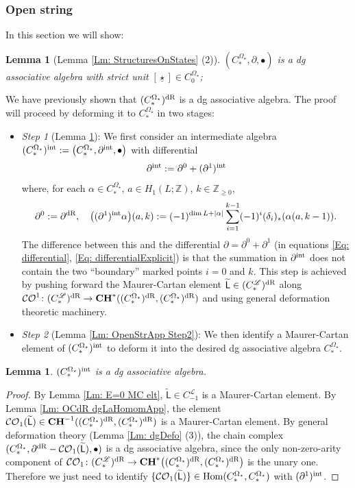 \documentclass[10pt]{amsart}
\numberwithin{equation}{section}
\theoremstyle{plain}
\newtheorem{lemma}[theorem]{Lemma}
\theoremstyle{definition}
\theoremstyle{remark}
\numberwithin{equation}{section}
\newcommand{\Z}{\mathbb{Z}}
\newcommand{\Hom}{\textup{Hom}}
\newcommand{\wt}[1]{\widetilde{#1}}
\newcommand{\dR}{\textup{dR}}
\newcommand{\CO}{\mathcal{CO}}
\newcommand{\CC}{\textbf{\textup{CH}}}
\newcommand{\CFr}{C_*^\mathscr{L}}
\newcommand{\CBa}{C_*^{\Omega_\star}}
\newcommand{\Cfr}[1]{C_{#1}^\mathscr{L}}
\newcommand{\Cba}[1]{C_{#1}^{\Omega_\star}}
\newcommand{\LL}{\textsf{L}}
\begin{document}
{\subsubsection{Open string}
In this section we will show:
\begin{lemma}[Lemma \ref{Lm: StructuresOnStates} (2)]\label{Lm: StructuresOnOpenStatesApp}
	$(\CBa, \partial, \bullet)$ is a dg associative algebra with strict unit $[\underline{\star}] \in \Cba{0}$;
\end{lemma}

We have previously shown that $(\CBa)^\dR$ is a dg associative algebra.
The proof will proceed by deforming it to $\CBa$ in two stages:
\begin{itemize}
	\item \emph{Step 1} (Lemma \ref{Lm: OpenStrApp Step1}): We first consider an intermediate algebra $(\CBa)^\textup{int}:=\big(\CBa, \partial^{\textup{int}}, \bullet\big)$ with differential \begin{align*}
		\partial^{\textup{int}} := \partial^0 + (\partial^1)^{\textup{int}}
	\end{align*}
	where, for each $\alpha \in \CBa$, $a\in H_1(L;\Z)$, $k\in \Z_{\geq 0}$,
	\begin{align}\label{Eq: differentialInt}
			\partial^0:=\partial^\dR,\quad \big((\partial^1)^{\textup{int}} \alpha\big)(a,k):= 
	(-1)^{\dim L+|\alpha|}\sum_{i=1}^{k-1} (-1)^i(\delta_i)_*(\alpha(a,k-1)).
	\end{align}
	The difference between this and the differential $\partial=\partial^0+\partial^1$ (in  equations \eqref{Eq: differential}, \eqref{Eq: differentialExplicit}) is that the summation in $\partial^{\textup{int}}$ does not contain the two ``boundary'' marked points $i=0$ and $k$.
	This step is achieved by pushing forward the Maurer-Cartan element $\wt{\LL} \in (\CFr)^\dR$ along $\CO^1\colon (\CFr)^\dR\to \CC^*((\CBa)^\dR,(\CBa)^\dR)$ and using general deformation theoretic machinery.
	\item \emph{Step 2} (Lemma \ref{Lm: OpenStrApp Step2}): We then identify a Maurer-Cartan element of $(\CBa)^{\textup{int}}$ to deform it into the desired dg associative algebra $\CBa$.
\end{itemize}


\begin{lemma}\label{Lm: OpenStrApp Step1}
	$(\CBa)^{\textup{int}}$ is a dg associative algebra.
\end{lemma}

\begin{proof}
 By Lemma \ref{Lm: E=0 MC elt}, $\wt{\LL}\in \Cfr{-1}$ is a Maurer-Cartan element. By Lemma \ref{Lm: OCdR dgLaHomomApp}, the element $\CO_1(\wt{\LL}) \in \CC^{-1}((\CBa)^\dR, (\CBa)^\dR)$ is a Maurer-Cartan element. By general deformation theory (Lemma \ref{Lm: dgDefo} (3)), the chain complex $(\CBa, \partial^\dR - \CO_1(\wt{\LL}), \bullet)$ is a dg associative algebra, since the only non-zero-arity component of $\CO_1\colon (\CFr)^\dR \to \CC^*\big((\CBa)^\dR,(\CBa)^\dR\big)$ is the unary one. 
 Therefore we just need to identify $\{\CO_1(\wt{\LL})\}\in \Hom(\CBa,\CBa)$ with $(\partial^1)^{\textup{int}}$.
 

\end{proof}}
\end{document}
